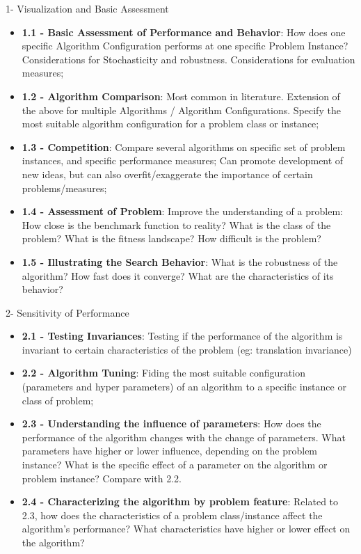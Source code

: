 \documentclass[aspectratio=169]{beamer}
\begin{document}
\begin{frame}{1- Visualization and Basic Assessment}
  \begin{itemize}
    \item {\bf 1.1 - Basic Assessment of Performance and Behavior}: How does one specific Algorithm Configuration performs at one specific Problem Instance? Considerations for Stochasticity and robustness. Considerations for evaluation measures;
    \item {\bf 1.2 - Algorithm Comparison}: Most common in literature. Extension of the above for multiple Algorithms / Algorithm Configurations. Specify the most suitable algorithm configuration for a problem class or instance;
    \item {\bf 1.3 - Competition}: Compare several algorithms on specific set of problem instances, and specific performance measures; Can promote development of new ideas, but can also overfit/exaggerate the importance of certain problems/measures;
    \item {\bf 1.4 - Assessment of Problem}: Improve the understanding of a problem: How close is the benchmark function to reality? What is the class of the problem? What is the fitness landscape? How difficult is the problem?
    \item {\bf 1.5 - Illustrating the Search Behavior}: What is the robustness of the algorithm? How fast does it converge? What are the characteristics of its behavior?
  \end{itemize}
\end{frame}

\begin{frame}{2- Sensitivity of Performance}
  \begin{itemize}
    \item {\bf 2.1 - Testing Invariances}: Testing if the performance of the algorithm is invariant to certain characteristics of the problem (eg: translation invariance)
    \item {\bf 2.2 - Algorithm Tuning}: Fiding the most suitable configuration (parameters and hyper parameters) of an algorithm to a specific instance or class of problem;
    \item {\bf 2.3 - Understanding the influence of parameters}: How does the performance of the algorithm changes with the change of parameters. What parameters have higher or lower influence, depending on the problem instance? What is the specific effect of a parameter on the algorithm or problem instance? Compare with 2.2.
    \item {\bf 2.4 - Characterizing the algorithm by problem feature}: Related to 2.3, how does the characteristics of a problem class/instance affect the algorithm's performance? What characteristics have higher or lower effect on the algorithm?
  \end{itemize}
  
\end{frame}
\end{document}
